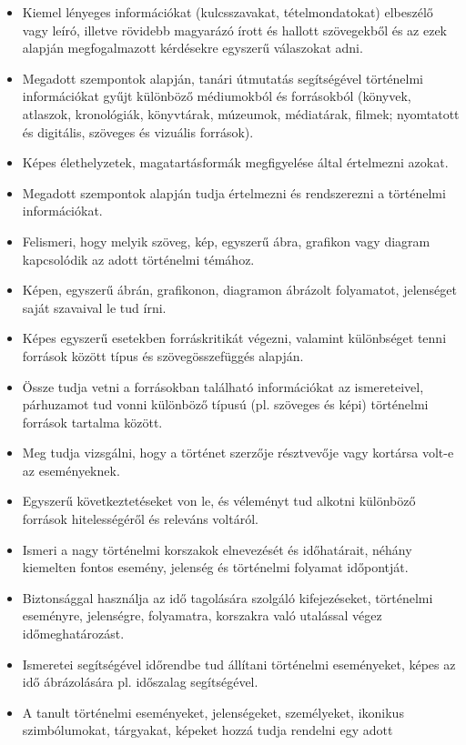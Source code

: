 \begin{itemize}
\item
  Kiemel lényeges információkat (kulcsszavakat, tételmondatokat)
  elbeszélő vagy leíró, illetve rövidebb magyarázó írott és hallott
  szövegekből és az ezek alapján megfogalmazott kérdésekre egyszerű
  válaszokat adni.
\item
  Megadott szempontok alapján, tanári útmutatás segítségével történelmi
  információkat gyűjt különböző médiumokból és forrásokból (könyvek,
  atlaszok, kronológiák, könyvtárak, múzeumok, médiatárak, filmek;
  nyomtatott és digitális, szöveges és vizuális források).
\item
  Képes élethelyzetek, magatartásformák megfigyelése által értelmezni
  azokat.
\item
  Megadott szempontok alapján tudja értelmezni és rendszerezni a
  történelmi információkat.
\item
  Felismeri, hogy melyik szöveg, kép, egyszerű ábra, grafikon vagy
  diagram kapcsolódik az adott történelmi témához.
\item
  Képen, egyszerű ábrán, grafikonon, diagramon ábrázolt folyamatot,
  jelenséget saját szavaival le tud írni.
\item
  Képes egyszerű esetekben forráskritikát végezni, valamint különbséget
  tenni források között típus és szövegösszefüggés alapján.
\item
  Össze tudja vetni a forrásokban található információkat az
  ismereteivel, párhuzamot tud vonni különböző típusú (pl. szöveges és
  képi) történelmi források tartalma között.
\item
  Meg tudja vizsgálni, hogy a történet szerzője résztvevője vagy
  kortársa volt-e az eseményeknek.
\item
  Egyszerű következtetéseket von le, és véleményt tud alkotni különböző
  források hitelességéről és releváns voltáról.
\item
  Ismeri a nagy történelmi korszakok elnevezését és időhatárait, néhány
  kiemelten fontos esemény, jelenség és történelmi folyamat időpontját.
\item
  Biztonsággal használja az idő tagolására szolgáló kifejezéseket,
  történelmi eseményre, jelenségre, folyamatra, korszakra való utalással
  végez időmeghatározást.
\item
  Ismeretei segítségével időrendbe tud állítani történelmi eseményeket,
  képes az idő ábrázolására pl. időszalag segítségével.
\item
  A tanult történelmi eseményeket, jelenségeket, személyeket, ikonikus
  szimbólumokat, tárgyakat, képeket hozzá tudja rendelni egy adott

\end{itemize}
